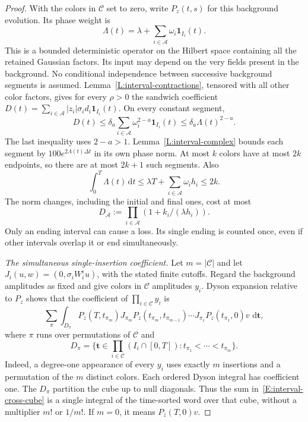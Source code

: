 \documentclass[12pt]{article}
\numberwithin{equation}{section}
\theoremstyle{definition}
\newcommand{\ud}{\,\mathrm{d}}
\begin{document}
\begin{proof}
  With the colors in $\mathcal C$ set to zero, write $P_z(t,s)$ for this
  background evolution. Its phase weight is
  \[
    \Lambda(t)=\lambda+\sum_{i\in\mathcal A}
    \omega_i\mathbf1_{I_i}(t).
  \]
  This is a bounded deterministic operator on the Hilbert space containing
  all the retained Gaussian factors. Its input may depend on the very
  fields present in the background. No conditional independence between
  successive background segments is assumed.
  Lemma~\ref{L:interval-contractions}, tensored with all other color
  factors, gives for every $\rho>0$ the sandwich coefficient
  $D(t)=\sum_{i\in\mathcal A}|z_i|\sigma_i d_i
  \mathbf1_{I_i}(t)$.
  On every constant segment,
  \[
    D(t)\le\delta_a\sum_{i\in\mathcal A}
    \omega_i^{2-a}\mathbf1_{I_i}(t)
    \le\delta_a\Lambda(t)^{2-a}.
  \]
  The last inequality uses $2-a>1$.
  Lemma~\ref{L:interval-complex} bounds each segment by
  $100e^{2\Lambda(t)\Delta t}$ in its own phase norm.
  At most $k$ colors have at most $2k$ endpoints, so there are at most
  $2k+1$ such segments. Also
  \[
    \int_0^T\Lambda(t)\ud t
    \le\lambda T+\sum_{i\in\mathcal A}\omega_i h_i\le2k.
  \]
  The norm changes, including the initial and final ones, cost at most
  \begin{equation}\label{E:interval-copy-metric}
    D_{\mathcal A}:=\prod_{i\in\mathcal A}
    (1+k_i/(\lambda h_i)).
  \end{equation}
  Only an ending interval can cause a loss. Its single ending is counted
  once, even if other intervals overlap it or end simultaneously.

  \emph{The simultaneous single-insertion coefficient.}
  Let $m=|\mathcal C|$ and let $J_i(u,w)=(0,\sigma_iW_i^\epsilon u)$,
  with the stated finite cutoffs. Regard the background amplitudes as
  fixed and give colors in $\mathcal C$ amplitudes $y_i$.
  Dyson expansion relative to $P_z$ shows that the coefficient of
  $\prod_{i\in\mathcal C}y_i$ is
  \begin{equation}\label{E:interval-cross-cube}
    \sum_{\pi}\int_{D_\pi}
    P_z(T,t_{\pi_m})J_{\pi_m}
    P_z(t_{\pi_m},t_{\pi_{m-1}})\cdots
    J_{\pi_1}P_z(t_{\pi_1},0)v\,\ud\boldsymbol t,
  \end{equation}
  where $\pi$ runs over permutations of $\mathcal C$ and
  \[
    D_\pi=\{\boldsymbol t\in
    \prod_{i\in\mathcal C}(I_i\cap[0,T]):
    t_{\pi_1}<\cdots<t_{\pi_m}\}.
  \]
  Indeed, a degree-one appearance of every $y_i$ uses exactly $m$
  insertions and a permutation of the $m$ distinct colors. Each ordered
  Dyson integral has coefficient one. The $D_\pi$ partition the cube up
  to null diagonals. Thus the sum in~\eqref{E:interval-cross-cube} is a
  single integral of the time-sorted word over that cube, without a
  multiplier $m!$ or $1/m!$. If $m=0$, it means $P_z(T,0)v$.


\end{proof}
\end{document}
